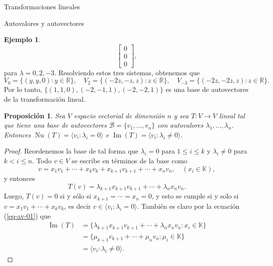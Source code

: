 \documentclass[a4paper,12pt,twoside,spanish]{amsbook}
\newtheorem{proposicion}[teorema]{Proposici\'on}
\theoremstyle{definition}
\newtheorem{ejemplo}{Ejemplo}[section]
\theoremstyle{remark}
\newcommand{\img}{\operatorname{Im}}
\newcommand{\nuc}{\operatorname{Nu}}
\newcommand{\R}{\mathbb R}
\newcommand{\K}{\mathbb K}
\begin{document}
\begin{chapter}{Transformaciones lineales}
\begin{section}{Autovalores y autovectores}
\begin{ejemplo}
\begin{equation*}
		\begin{bmatrix} 0\\0 \\0\end{bmatrix},
		\end{equation*}  
		para $\lambda =0, 2,-3$. Resolviendo estos tres sistemas, obtenemos que 
		\begin{equation*}
			V_0 = \{(y,y,0): y \in \R \},\quad V_2 = \{(-2z,-z,z): z \in \R \},\quad V_{-3} = \{(-2z,-2z,z): z \in \R \}. 
		\end{equation*}
		Por lo tanto, $\{(1,1,0), (-2,-1,1), (-2,-2,1)\}$ es una base de autovectores de la transformación lineal. 
		\end{ejemplo}
		
		\begin{proposicion} Sea $V$ espacio vectorial de dimensión $n$ y sea $T: V \to V$ lineal tal que tiene una base de autovectores $\mathcal{B} = \{v_1,\ldots,v_n \}$  con autovalores $\lambda_1,\ldots,\lambda_n$. Entonces $\nuc(T)=\langle v_i: \lambda_i =0 \rangle$ e  $\img(T)=\langle v_i: \lambda_i \not=0 \rangle$.			
		\end{proposicion}
		\begin{proof} Reordenemos la base de tal forma que  $\lambda_i =0$ para $1 \le i \le k$ y $\lambda_i \ne 0$ para $k < i \le n$. 
		Todo $v \in V$ se escribe en términos de la base como 
		$$
		v = x_1v_1 + \cdots+ x_k v_k+ x_{k+1} v_{k+1}+\cdots+ x_n v_n,\quad (x_i \in \K),
		$$
		y entonces
		\begin{equation}\label{eq-av-01}
			T(v) =  \lambda_{k+1}x_{k+1} v_{k+1}+\cdots+ \lambda_nx_n v_n.
		\end{equation}
		Luego, $T(v) =0$ si y sólo si $x_{k+1} = \cdots = x_n=0$, y esto se cumple si y solo si $v =  x_1v_1 + \cdots+ x_k v_k$,  es decir $v \in \langle v_i: \lambda_i =0 \rangle$. 
		También es claro por la ecuación (\ref{eq-av-01}) que 
		\begin{align*}
			\img(T) &= \{\lambda_{k+1}x_{k+1} v_{k+1}+\cdots+ \lambda_nx_n v_n: x_i \in \K \} \\
			&=\{\mu_{k+1} v_{k+1}+\cdots+ \mu_n v_n: \mu_i \in \K \}\\
			&= \langle v_i: \lambda_i \not=0 \rangle.
		\end{align*}
		\end{proof}
		

\end{section}
\end{chapter}
\end{document}
